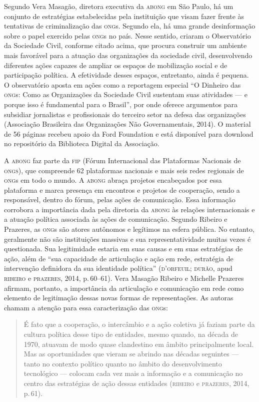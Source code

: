 Segundo Vera Masagão, diretora executiva da \textsc{abong} em São Paulo, há um
conjunto de estratégias estabelecidas pela instituição que visam fazer
frente às tentativas de criminalização das \textsc{ong}s. Segundo ela, há uma
grande desinformação sobre o papel exercido pelas \textsc{ong}s no país. Nesse
sentido, criaram o Observatório da Sociedade Civil, conforme citado
acima, que procura construir um ambiente mais favorável para a atuação
das organizações da sociedade civil, desenvolvendo diferentes ações
capazes de ampliar os espaços de mobilização social e de participação
política. A efetividade desses espaços, entretanto, ainda é pequena. O
observatório aposta em ações como a reportagem especial ``O Dinheiro das
\textsc{ong}s: Como as Organizações da Sociedade Civil sustentam suas atividades
--- e porque isso é fundamental para o Brasil'', por onde oferece
argumentos para subsidiar jornalistas e profissionais do terceiro setor
na defesa das organizações (Associação Brasileira das Organizações
Não Governamentais, 2014). O material de 56 páginas recebeu apoio da
Ford Foundation e está disponível para download no repositório da
Biblioteca Digital da Associação.

A \textsc{abong} faz parte da \textsc{fip} (Fórum Internacional das Plataformas Nacionais
de \textsc{ongs}), que compreende 62 plataformas nacionais e mais seis redes
regionais de \textsc{ong}s em todo o mundo. A \textsc{abong} abraça projetos encabeçados
por essa plataforma e marca presença em encontros e projetos de
cooperação, sendo a responsável, dentro do fórum, pelas ações de
comunicação. Essa informação corrobora a importância dada pela diretoria
da \textsc{abong} às relações internacionais e a atuação política associada às
ações de comunicação. Segundo Ribeiro e Prazeres, as \textsc{ong}s são atores
autônomos e legítimos na esfera pública. No entanto, geralmente não são
instituições massivas e sua representatividade muitas vezes é
questionada. Sua legitimidade estaria em suas causas e em suas
estratégias de ação, além de ``sua capacidade de articulação e ação em
rede, estratégia de intervenção definidora da sua identidade política''
(\textsc{d'orfeuil; durão}, apud \textsc{ribeiro} e \textsc{prazeres}, 2014, p.\,60--61). Vera
Masagão Ribeiro e Michelle Prazeres afirmam, portanto, a importância da
articulação e comunicação em rede como elemento de legitimação dessas
novas formas de representações. As autoras chamam a atenção para essa
caracterização das \textsc{ong}s:

\begin{quote}
É fato que a cooperação, o intercâmbio e a ação coletiva já faziam parte
da cultura política desse tipo de entidades, mesmo quando, na década de
1970, atuavam de modo quase clandestino em âmbito principalmente local.
Mas as oportunidades que vieram se abrindo nas décadas seguintes ---
tanto no contexto político quanto no âmbito do desenvolvimento
tecnológico --- colocam cada vez mais a informação e a comunicação no
centro das estratégias de ação dessas entidades (\textsc{ribeiro} e \textsc{prazeres},
2014, p.\,61).
\end{quote}

